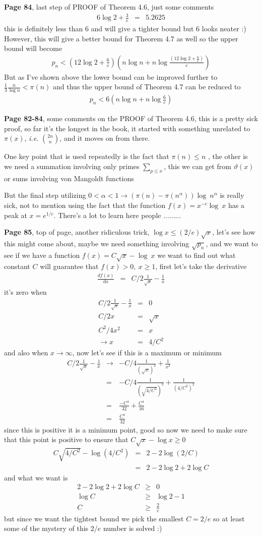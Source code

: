 \documentclass[aps,preprint,preprintnumbers,nofootinbib,showpacs,prd]{revtex4-1}
\newcommand{\ie}{{\it i.e.} }
\newcommand{\nbea}{\begin{eqnarray*}}
\newcommand{\neea}{\end{eqnarray*}}
\begin{document}
{\bf Page 84}, last step of PROOF of Theorem 4.6, just some comments
%
\nbea
6\log 2 + \frac{3}{e} & = & 5.2625
\neea
%
this is definitely less than 6 and will give a tighter bound but $6$ looks neater :) However, this will give a better bound for Theorem 4.7 as well so the upper bound will become
%
\nbea
p_n < \left(12\log 2 + \frac{6}{e}\right) \left(n\log n + n\log\frac{ \left(12\log 2 + \frac{6}{e}\right)}{e}\right)
\neea
%
But as I've shown above the lower bound can be improved further to $\frac{1}{3}\frac{n}{\log n} < \pi(n)$ and thus the upper bound of Theorem 4.7 can be reduced to
%
\nbea
p_n < 6 \left(n\log n + n\log\frac{6}{e}\right)
\neea
%

{\bf Page 82-84}, some comments on the PROOF of Theorem 4.6, this is a pretty sick proof, so far it's the longest in the book, it started with something unrelated to $\pi(x)$, \ie ${2n \choose n}$, and it moves on from there.

One key point that is used repeatedly is the fact that $\pi(n) \le n$ , the other is we need a summation involving only primes $\sum_{p \le x}$, this we can get from $\vartheta(x)$ or sums involving von Mangoldt functions

But the final step utilizing $0 <\alpha<1 \to (\pi(n) - \pi(n^\alpha))\log~n^\alpha$ is really sick, not to mention using the fact that the function $f(x) = x^{-c} \log~x$ has a peak at $x = e^{1/c}$. There's a lot to learn here people .........

{\bf Page 85}, top of page, another ridiculous trick, $\log x \le (2/e)\sqrt{x}$, let's see how this might come about, maybe we need something involving $\sqrt{p_n}$, and we want to see if we have a function $f(x) = C\sqrt{x} - \log~x$ we want to find out what constant $C$ will guarantee that $f(x) > 0, ~x \ge 1$, first let's take the derivative
%
\nbea
\frac{df(x)}{dx} & = & C/2 \frac{1}{\sqrt{x}} - \frac{1}{x}
\neea
%
it's zero when
%
\nbea
C/2 \frac{1}{\sqrt{x}} - \frac{1}{x} & = & 0 \\
C/2x & = & \sqrt{x} \\
C^2/4 x^2 & = & x \\
\to x & = & 4/C^2
\neea
%
and also when $x\to\infty$, now let's see if this is a maximum or minimum
%
\nbea
C/2 \frac{1}{\sqrt{x}} - \frac{1}{x} & \to & -C/4 \frac{1}{\left (\sqrt{x}\right )^3} + \frac{1}{x^2} \\
& = & -C/4 \frac{1}{\left (\sqrt{4/C^2}\right )^3} + \frac{1}{(4/C^2)^2} \\
& = & \frac{-C^4}{32} + \frac{C^4}{16} \\
& = & \frac{C^4}{32}
\neea
%
since this is positive it is a minimum point, good so now we need to make sure that this point is positive to ensure that $C\sqrt{x} - \log x \ge 0$
%
\nbea
C\sqrt{4/C^2} - \log (4/C^2) & = & 2 - 2 \log (2/C) \\
& = & 2 - 2 \log 2 + 2\log C
\neea
%
and what we want is
%
\nbea
2 - 2 \log 2 + 2\log C & \ge & 0 \\
\log C & \ge & \log 2 - 1 \\
C & \ge & \frac{2}{e}
\neea
%
but since we want the tightest bound we pick the smallest $C = 2/e$ so at least some of the mystery of this $2/e$ number is solved :)
\end{document}
